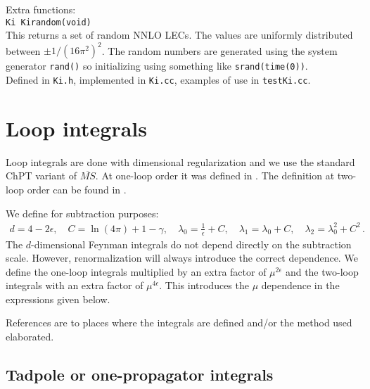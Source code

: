 \documentclass[12pt,a4paper]{article}
\newcommand{\mytt}[1]{\texttt{#1}}
\newcommand{\newfunction}[1]{\mytt{#1}\index{\mytt{#1}}}
\begin{document}
Extra functions:\\
\mytt{Ki \newfunction{Kirandom}(void)}\\
This returns a set of random NNLO LECs.
The values are uniformly distributed between $\pm1/(16\pi^2)^2$.
The random numbers are generated using the
system generator \mytt{rand()} so initializing using something like
\mytt{srand(time(0))}.\\

Defined in \mytt{Ki.h}, implemented in \mytt{Ki.cc},
examples of use in \mytt{testKi.cc}.


\section{Loop integrals}

Loop integrals are done with dimensional regularization and we use
the standard ChPT variant of $\overline{MS}$.
At one-loop order it was defined in \cite{Gasser:1983yg,Gasser:1984gg}.
The definition at two-loop order can be found in \cite{Bijnens:1999hw}.

We define for subtraction purposes:
\begin{align}
\label{defCC}
d = 4-2\epsilon,\quad C=\ln(4\pi)+1-\gamma,\quad
\lambda_0 = \frac{1}{\epsilon}+C,\quad\lambda_1=\lambda_0+C,\quad
\lambda_2=\lambda_0^2+C^2\,.
\end{align}
The $d$-dimensional Feynman integrals do not depend directly on the subtraction
scale. However, renormalization will always introduce the correct dependence.
We define the one-loop integrals multiplied by an extra factor
of $\mu^{2\epsilon}$ and the two-loop integrals with an extra factor
of $\mu^{4\epsilon}$. This introduces the $\mu$ dependence in the expressions
given below.

References are to places where the integrals are defined and/or the method used
elaborated.

\subsection{Tadpole or one-propagator integrals}
\label{tadpoles}
\end{document}
